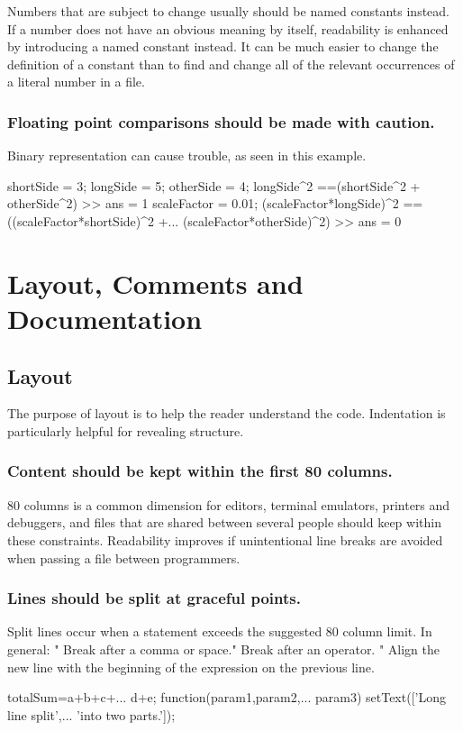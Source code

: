\documentclass[titlepage,a4paper,12pt]{article}
\begin{document}
Numbers that are subject to change usually should be named constants
instead. If a number does not have an obvious meaning by itself,
readability is enhanced by introducing a named constant instead. It
can be much easier to change the definition of a constant than to
find and change all of the relevant occurrences of a literal number
in a file.


\subsubsection{Floating point comparisons should be made with
caution.}

 Binary
representation can cause trouble, as seen in this example.
\begin{verbmcode}
shortSide = 3;
longSide = 5;
otherSide = 4;
longSide^2 ==(shortSide^2 + otherSide^2)
>> ans = 1
scaleFactor = 0.01;
(scaleFactor*longSide)^2 == ((scaleFactor*shortSide)^2 +...
(scaleFactor*otherSide)^2)
>> ans = 0
\end{verbmcode}

\section{Layout, Comments and Documentation}

 \subsection{Layout}
The purpose of layout is to help the reader understand the code.
Indentation is particularly helpful for revealing structure.

 \subsubsection{Content
should be kept within the first 80 columns.}
 80 columns is a common
dimension for editors, terminal emulators, printers and debuggers,
and files that are shared between several people should keep within
these constraints. Readability improves if unintentional line breaks
are avoided when passing a file between programmers.

\subsubsection{Lines should be
split at graceful points.}
 Split lines occur when a statement
exceeds the suggested 80 column limit. In general: " Break after a
comma or space." Break after an operator. " Align the new line with
the beginning of the expression on the previous line.
\begin{verbmcode}
totalSum=a+b+c+...
    d+e;
function(param1,param2,...
    param3)
setText(['Long line split',...
    'into two parts.']);
\end{verbmcode}
\end{document}
